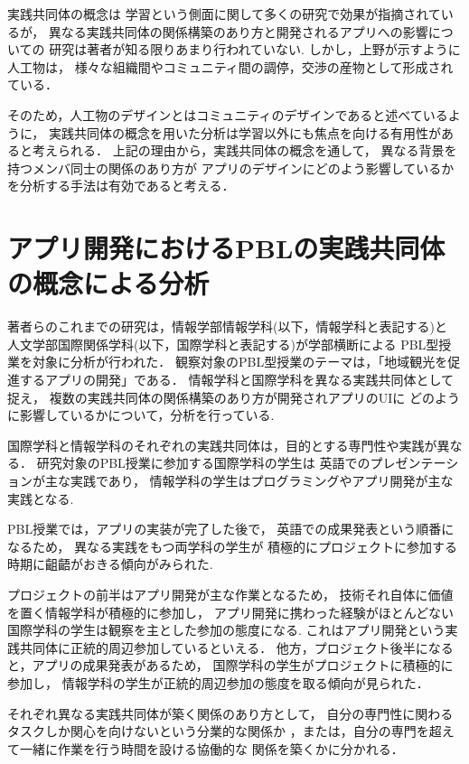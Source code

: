 \documentclass[twoside]{wiss}
\begin{document}
実践共同体の概念は
学習という側面に関して多くの研究で効果が指摘されているが，
異なる実践共同体の関係構築のあり方と開発されるアプリへの影響についての
研究は著者が知る限りあまり行われていない.
しかし，上野\cite{uenoArt}が示すように人工物は，
様々な組織間やコミュニティ間の調停，交渉の産物として形成されている．


そのため，人工物のデザインとはコミュニティのデザインであると述べているように，
実践共同体の概念を用いた分析は学習以外にも焦点を向ける有用性があると考えられる．
上記の理由から，実践共同体の概念を通して，
異なる背景を持つメンバ同士の関係のあり方が
アプリのデザインにどのよう影響しているかを分析する手法は有効であると考える．

\section{アプリ開発におけるPBLの実践共同体の概念による分析}
\label{previous-research-pbl}

著者らのこれまでの研究は，情報学部情報学科(以下，情報学科と表記する)と
人文学部国際関係学科(以下，国際学科と表記する)が学部横断による
PBL型授業を対象に分析が行われた．
観察対象のPBL型授業のテーマは，「地域観光を促進するアプリの開発」である．
情報学科と国際学科を異なる実践共同体として捉え，
複数の実践共同体の関係構築のあり方が開発されアプリのUIに
どのように影響しているかについて，分析を行っている.

国際学科と情報学科のそれぞれの実践共同体は，目的とする専門性や実践が異なる．
研究対象のPBL授業に参加する国際学科の学生は
英語でのプレゼンテーションが主な実践であり，
情報学科の学生はプログラミングやアプリ開発が主な実践となる.
　

PBL授業では，アプリの実装が完了した後で，
英語での成果発表という順番になるため，
異なる実践をもつ両学科の学生が
積極的にプロジェクトに参加する時期に齟齬がおきる傾向がみられた.


プロジェクトの前半はアプリ開発が主な作業となるため，
技術それ自体に価値を置く情報学科が積極的に参加し，
アプリ開発に携わった経験がほとんどない国際学科の学生は観察を主とした参加の態度になる.
これはアプリ開発という実践共同体に正統的周辺参加しているといえる．
他方，プロジェクト後半になると，アプリの成果発表があるため，
国際学科の学生がプロジェクトに積極的に参加し，
情報学科の学生が正統的周辺参加の態度を取る傾向が見られた．

それぞれ異なる実践共同体が築く関係のあり方として，
自分の専門性に関わるタスクしか関心を向けないという分業的な関係か
，または，自分の専門を超えて一緒に作業を行う時間を設ける協働的な
関係を築くかに分かれる．
\end{document}
